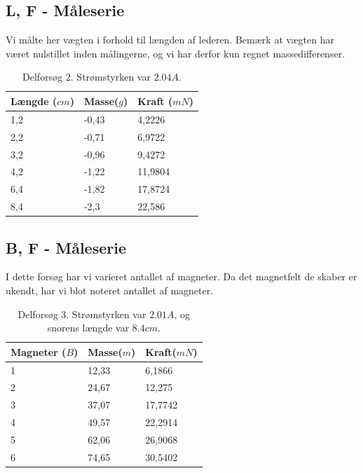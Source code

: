 \documentclass[10pt,a4paper]{article}
\theoremstyle{break}
\theoremstyle{nonumberplain}
\begin{document}
\pagebreak
\subsection{L, F - Måleserie}
Vi målte her vægten i forhold til længden af lederen. 
Bemærk at vægten har været nulstillet inden målingerne, og vi har derfor kun regnet massedifferenser. 

\begin{table}[h]
\centering

\label{my-label}
\begin{tabular}{|l|ll|}
\hline
\textbf{Længde ($cm$)} & \textbf{Masse($g$)} & \textbf{Kraft ($mN$)} \\ \hline
1,2                    & -0,43               & 4,2226                \\
2,2                    & -0,71               & 6,9722                \\
3,2                    & -0,96               & 9,4272                \\
4,2                    & -1,22               & 11,9804               \\
6,4                    & -1,82               & 17,8724               \\
8,4                    & -2,3                & 22,586               \\
\hline
\end{tabular}
\caption{Delforsøg 2. Strømstyrken var $2.04A$.}
\end{table}

\subsection{B, F - Måleserie}
I dette forsøg har vi varieret antallet af magneter. 
Da det magnetfelt de skaber er ukendt, har vi blot noteret antallet af magneter.

\begin{table}[h]
\centering

\label{my-label}
\begin{tabular}{|l|ll|}
\hline
\textbf{Magneter ($B$)} & \textbf{Masse($m$)} & \textbf{Kraft($mN$)} \\ \hline
1                       & 12,33               & 6,1866               \\
2                       & 24,67               & 12,275               \\
3                       & 37,07               & 17,7742              \\
4                       & 49,57               & 22,2914              \\
5                       & 62,06               & 26,9068              \\
6                       & 74,65               & 30,5402   			\\
\hline          
\end{tabular}

\caption{Delforsøg 3. Strømstyrken var $2.01 A$, og snorens længde var $8.4cm$.}
\end{table}
\end{document}
